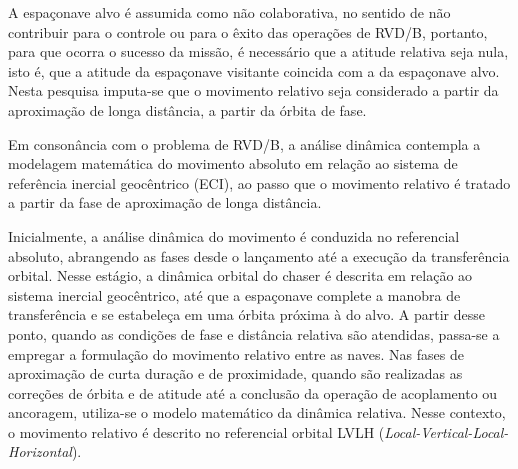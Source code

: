 A espaçonave alvo é assumida como não colaborativa, no sentido de não contribuir para o controle ou para o êxito das operações de RVD/B, portanto, para que ocorra o sucesso da missão, é necessário que a atitude relativa seja nula, isto é, que a atitude da espaçonave visitante coincida com a da espaçonave alvo.
Nesta pesquisa imputa-se que o movimento relativo seja considerado a partir da aproximação de longa distância, a partir da órbita de fase.

Em consonância com o problema de RVD/B, a análise dinâmica contempla a modelagem matemática do movimento absoluto em relação ao sistema de referência inercial geocêntrico (ECI), ao passo que o movimento relativo é tratado a partir da fase de aproximação de longa distância.

Inicialmente, a análise dinâmica do movimento é conduzida no referencial absoluto, abrangendo as fases desde o lançamento até a execução da transferência orbital. Nesse estágio, a dinâmica orbital do chaser é descrita em relação ao sistema inercial geocêntrico, até que a espaçonave complete a manobra de transferência e se estabeleça em uma órbita próxima à do alvo. A partir desse ponto, quando as condições de fase e distância relativa são atendidas, passa-se a empregar a formulação do movimento relativo entre as naves.
Nas fases de aproximação de curta duração e de proximidade, quando são realizadas as correções de órbita e de atitude até a conclusão da operação de acoplamento ou ancoragem, utiliza-se o modelo matemático da dinâmica relativa.
Nesse contexto, o movimento relativo é descrito no referencial orbital LVLH (\emph{Local-Vertical-Local-Horizontal}).












